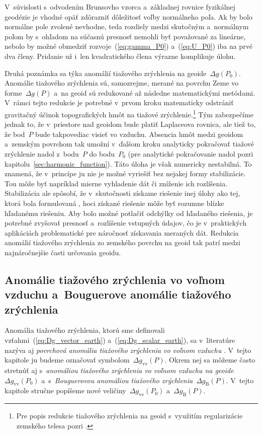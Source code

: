 \documentclass[a4paper, 12pt]{book}
\begin{document}
V~súvislosti s~odvodením Brunsovho vzorca a~základnej rovnice fyzikálnej 
geodézie je vhodné opäť zdôrazniť dôležitosť voľby normálneho poľa.  Ak by bolo 
normálne pole zvolené nevhodne, teda rozdiely medzi skutočným a~normálnym poľom 
by s~ohľadom na súčasnú presnosť nemohli byť považované za lineárne, nebolo by 
možné obmedziť rozvoje~(\ref{eq:gamma_P0}) a~(\ref{eq:U_P0}) iba na prvé dva 
členy.  Pridanie už i~len kvadratického člena výrazne komplikuje úlohu.

Druhá poznámka sa týka anomálií tiažového zrýchlenia na geoide~$\Delta g(P_0)$.  
Anomálie tiažového zrýchlenia sú, samozrejme, merané na povrchu Zeme vo 
forme~$\Delta g(P)$ a~na geoid sú redukované až následne matematickými 
metódami.  V~rámci tejto redukcie je potrebné v~prvom kroku matematicky 
odstrániť gravitačný účinok topografických hmôt na tiažové 
zrýchlenie.\footnote{Pre popis redukcie tiažového zrýchlenia na geoid 
s~využitím regularizácie zemského telesa pozri \textcite{Janak2006}.}  Tým 
zabezpečíme jednak to, že v~priestore nad geoidom bude platiť Laplaceova 
rovnica, ale tiež to, že bod~$P$ bude takpovediac visieť vo vzduchu.  Absencia 
hmôt medzi geoidom a~zemským povrchom tak umožní v~ďalšom kroku analyticky 
pokračovať tiažové zrýchlenie nadol z~bodu~$P$ do bodu~$P_0$ (pre analytické 
pokračovanie nadol pozri kapitolu~\ref{sec:harmonic_function}).  Táto úloha je 
však numericky nestabilná.  To znamená, že v~princípe ju nie je možné vyriešiť 
bez nejakej formy stabilizácie.  Tou môže byť napríklad mierne vyhladenie dát 
či zníženie ich rozlíšenia.  Stabilizácia ale spôsobí, že v~skutočnosti získame 
riešenie inej úlohy ako tej, ktorá bola formulovaná 
\parencite{SansoGeodeticBoundaryValueProblem}, hoci získané riešenie môže byť 
rozumne blízke hľadanému riešeniu.  Aby bolo možné potlačiť odchýlky od 
hľadaného riešenia, je potrebné zvyšovať presnosť a~rozlíšenie vstupných 
údajov, čo je v~praktických aplikáciách problematické pre náročnosť získavania 
meraných dát.  Redukcia anomálií tiažového zrýchlenia zo zemského povrchu na 
geoid tak patrí medzi najnáročnejšie časti určovania geoidu.





\subsection{Anomálie tiažového zrýchlenia vo voľnom vzduchu a~Bouguerove 
anomálie tiažového zrýchlenia}

Anomália tiažového zrýchlenia, ktorú sme definovali 
vzťahmi~(\ref{eq:Dg_vector_earth}) a~(\ref{eq:Dg_scalar_earth}), sa 
v~literatúre nazýva aj \emph{povrchová anomália tiažového zrýchlenia vo voľnom 
vzduchu} \parencite{SansoGeoidDetermination}.  V~tejto kapitole ju budeme 
označovať symbolom~$\Delta g_{\mathrm{vv}}(P)$.  Okrem nej sa môžeme často 
stretnúť aj s~\emph{anomáliou tiažového zrýchlenia vo voľnom vzduchu na 
geoide}~$\Delta g_{\mathrm{vv}}(P_0)$ a~s~\emph{Bouguerovou anomáliou tiažového 
zrýchlenia}~$\Delta g_{\mathrm{B}}(P)$.  V~tejto kapitole stručne popíšeme nové 
veličiny~$\Delta g_{\mathrm{vv}}(P_0)$ a~$\Delta g_{\mathrm{B}}(P)$.
\end{document}
